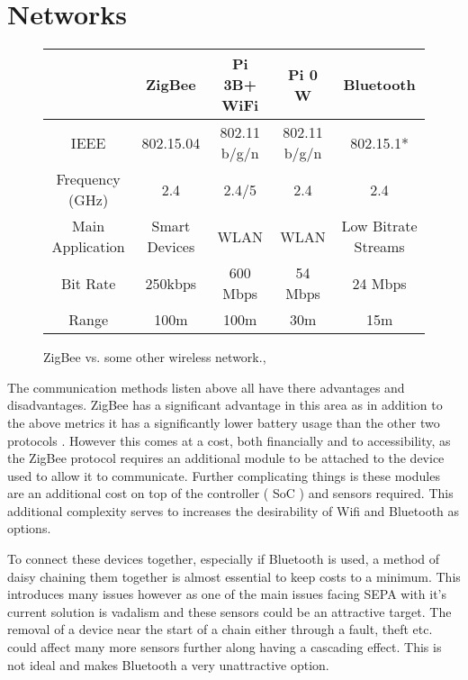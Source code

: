 \section{Networks}

\begin{figure}[H]
	\hspace{-1cm}
	\centering
	\begin{tabular}{ccccc}
		\hline
		{} & ZigBee & Pi 3B+ WiFi & Pi 0 W & Bluetooth \\
		\hline
		IEEE & 802.15.04 & 802.11 b/g/n & 802.11 b/g/n & 802.15.1* \\
		Frequency (GHz) & 2.4 & 2.4/5 & 2.4 & 2.4 \\
		Main Application & Smart Devices & WLAN & WLAN & Low Bitrate Streams \\
		Bit Rate & 250kbps & 600 Mbps & 54 Mbps & 24 Mbps \\
		Range & 100m & 100m & 30m & 15m \\
		\hline 
	\end{tabular}
	\caption{ ZigBee vs. some other wireless network.\citep{RaspberryPiFoundation2018}, \citep{RaspberryPiFoundation2017} }
	\label{fig:networkcompare}
\end{figure}

The communication methods listen above all have there advantages and disadvantages. ZigBee has a significant advantage in this area as in addition to the above metrics it has a significantly lower battery usage than the other two protocols \citep{Leccese2014}. However this comes at a cost, both financially and to accessibility, as the ZigBee protocol requires an additional module to be attached to the device used to allow it to communicate. Further complicating things is these modules are an additional cost on top of the controller ( SoC ) and sensors required. \citep{zigbee2015} This additional complexity serves to increases the desirability of Wifi and Bluetooth as options. 

To connect these devices together, especially if Bluetooth is used, a method of daisy chaining them together is almost essential to keep costs to a minimum. This introduces many issues however as one of the main issues facing SEPA with it's current solution is vadalism \citep{SEPA2018} and these sensors could be an attractive target. The removal of a device near the start of a chain either through a fault, theft etc. could affect many more sensors further along having a cascading effect. This is not ideal and makes Bluetooth a very unattractive option.

